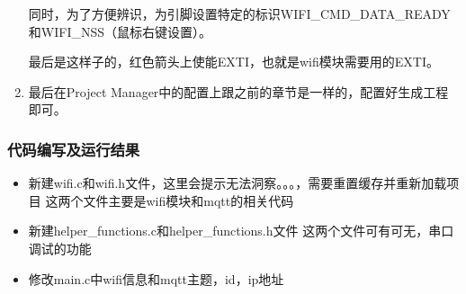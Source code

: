 \documentclass[a4paper,12pt,english]{sphinxmanual}
\begin{document}
\begin{enumerate}
\sphinxAtStartPar
同时，为了方便辨识，为引脚设置特定的标识WIFI\_CMD\_DATA\_READY和WIFI\_NSS（鼠标右键设置）。

\sphinxAtStartPar
最后是这样子的，红色箭头上使能EXTI，也就是wifi模块需要用的EXTI。

\item {} 
\sphinxAtStartPar
最后在Project Manager中的配置上跟之前的章节是一样的，配置好生成工程即可。

\end{enumerate}


\subsubsection{代码编写及运行结果}
\label{\detokenize{exp-stm32/mqtt:id7}}\begin{itemize}
\item {} 
\sphinxAtStartPar
新建wifi.c和wifi.h文件，这里会提示无法洞察。。。，需要重置缓存并重新加载项目
这两个文件主要是wifi模块和mqtt的相关代码

\item {} 
\sphinxAtStartPar
新建helper\_functions.c和helper\_functions.h文件
这两个文件可有可无，串口调试的功能

\item {} 
\sphinxAtStartPar
修改main.c中wifi信息和mqtt主题，id，ip地址

\begin{sphinxVerbatim}[commandchars=\\\{\}]
\PYG{p}{[}\PYG{p}{]}
\PYG{p}{[}\PYG{p}{]}
\PYG{p}{[}\PYG{p}{]}
\PYG{p}{[}\PYG{p}{]}
\PYG{p}{[}\PYG{p}{]}
\end{sphinxVerbatim}


\end{itemize}
\end{document}
